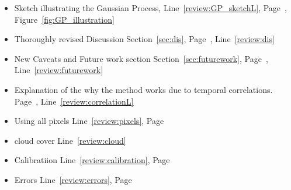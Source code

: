 \documentclass[review]{elsarticle}
\begin{document}
\begin{itemize}
    \item Sketch illustrating the Gaussian Process, Line~\ref{review:GP_sketchL}, Page~\pageref{review:GP_sketch}, Figure~\ref{fig:GP_illustration}
    \item Thoroughly revised Discussion Section~\ref{sec:dis}, Page~\pageref{sec:dis}, Line~\ref{review:dis}
        \item New Caveats and Future work section Section~\ref{sec:futurework}, Page~\pageref{sec:futurework}, Line~\ref{review:futurework}
        \item Explanation of the why the method works due to temporal correlations.  Page~\pageref{review:correlation}, Line~\ref{review:correlationL}

\item Using all pixels Line~\ref{review:pixels}, Page ~\pageref{review:pixels}

\item cloud cover Line~\ref{review:cloud}
 

 \item Calibratiion Line~\ref{review:calibration}, Page \pageref{review:calibration}

\item Errors Line~\ref{review:errors}, Page \pageref{review:errors}


\end{itemize}
\end{document}
